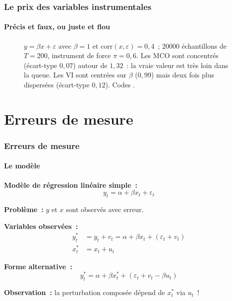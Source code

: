 \documentclass[10pt]{beamer}
\begin{document}
\begin{frame}[c]
  \frametitle{Le prix des variables instrumentales}
  \framesubtitle{Précis et faux, ou juste et flou}

  \begin{figure}
    \centering
    \scalebox{.42}{}
    \caption{$y=\beta x+\varepsilon$ avec $\beta=1$ et $\mathrm{corr}(x,\varepsilon)=0{,}4$~;
      $20000$ échantillons de $T=200$, instrument de force $\pi=0{,}6$. Les MCO
      sont concentrés (écart-type $0{,}07$) autour de $1{,}32$~: la vraie valeur
      est très loin dans la queue. Les VI sont centrées sur $\beta$
      ($0{,}99$) mais deux fois plus dispersées (écart-type $0{,}12$). Codes
      .}
  \end{figure}

\end{frame}


\section{Erreurs de mesure}

\begin{frame}
  \frametitle{Erreurs de mesure}
  \framesubtitle{Le modèle}

  \textbf{Modèle de régression linéaire simple~:}
  \[ y_t = \alpha + \beta x_t + \varepsilon_t \]

  \textbf{Problème~:} $y$ et $x$ sont observés avec erreur.

  \medskip

  \textbf{Variables observées~:}
  \begin{align*}
    y_t^* &= y_t + v_t = \alpha + \beta x_t + \left(\varepsilon_t + v_t\right) \\
    x_t^* &= x_t + u_t
  \end{align*}

  \medskip

  \textbf{Forme alternative~:}
  \[ y_t^* = \alpha + \beta x_t^* + \left(\varepsilon_t + v_t - \beta u_t\right) \]

  \medskip

  \textbf{Observation~:} la perturbation composée dépend de $x_t^*$ via $u_t$~!

\end{frame}
\end{document}

